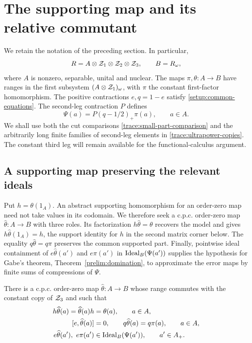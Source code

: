 \section{The supporting map and its relative commutant}
\label{sec:commutant}

We retain the notation of the preceding section.  In particular,
\[
 R=A\otimes\mathcal Z_1\otimes\mathcal Z_2\otimes\mathcal Z_3,
 \qquad B=R_\omega,
\]
where $A$ is nonzero, separable, unital and nuclear.  The maps
$\pi,\theta\colon A\to B$ have ranges in the first subsystem
$(A\otimes\mathcal Z_1)_\omega$, with $\pi$ the constant first-factor
homomorphism.  The positive contractions $e,q=1-e$ satisfy
\eqref{setup:common-equations}.  The second-leg contraction $P$ defines
\[
 \Psi(a)=P(q-1/2)_+\pi(a),\qquad a\in A.
\]
We shall use both the cut comparisons \eqref{trace:small-part-comparison} and
the arbitrarily long finite families of second-leg elements in
\eqref{trace:ultrapower-copies}.  The constant third leg will remain available
for the functional-calculus argument.

\subsection{A supporting map preserving the relevant ideals}

Put $h=\theta(1_A)$.  An abstract supporting homomorphism for an
order-zero map need not take values in its codomain.  We therefore seek
a c.p.c. order-zero map $\widehat\theta\colon A\to B$ with three
roles.  Its factorization $h\widehat\theta=\theta$ recovers the model
and gives $h\widehat\theta(1_A)=h$, the support identity for $h$ in
the second matrix corner below.  The equality
$q\widehat\theta=q\pi$ preserves the common supported part.
Finally, pointwise ideal containment of $e\widehat\theta(a')$ and
$e\pi(a')$ in $\operatorname{Ideal}_B(\Psi(a'))$ supplies the hypothesis for
Gabe's theorem, Theorem~\ref{prelim:domination}, to approximate the
error maps by finite sums of compressions of $\Psi$.

\begin{proposition}\label{support:map}
There is a c.p.c. order-zero map $\widehat\theta\colon A\to B$
whose range commutes with the constant copy of $\mathcal Z_3$ and such that
\begin{align}
 h\widehat\theta(a)=\widehat\theta(a)h&=\theta(a),
       \qquad a\in A,\label{support:factorization}\\
 [e,\widehat\theta(a)]&=0,
 \qquad q\widehat\theta(a)=q\pi(a),\qquad a\in A,
       \label{support:common}\\
 e\widehat\theta(a'),\ e\pi(a')&\in\operatorname{Ideal}_B(\Psi(a')),
       \qquad a'\in A_+.
       \label{support:ideals}
\end{align}
\end{proposition}

